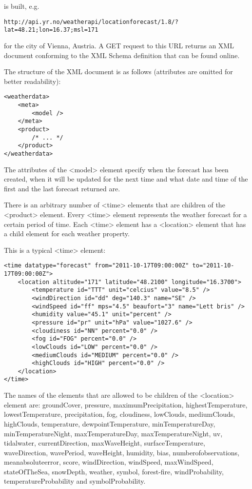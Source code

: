 is built, e.g.

\begin{lstlisting}
http://api.yr.no/weatherapi/locationforecast/1.8/?lat=48.21;lon=16.37;msl=171
\end{lstlisting}

for the city of Vienna, Austria. A GET request to this URL returns an XML document conforming to the XML Schema definition that can be found
online.

The structure of the XML document is as follows (attributes are omitted for better readability):

\begin{lstlisting}
<weatherdata>
	<meta>
		<model />
	</meta>
	<product>
		/* ... */
	</product>
</weatherdata>
\end{lstlisting}

The attributes of the <model> element specify when the forecast has been created, when it will be updated for the next time and what date and time of the first and the last forecast returned are.

There is an arbitrary number of <time> elements that are children of the <product> element. Every <time> element represents the weather forecast for a certain period of time. Each <time> element has a <location> element that has a child element for each weather property.

This is a typical <time> element:

\begin{lstlisting}
<time datatype="forecast" from="2011-10-17T09:00:00Z" to="2011-10-17T09:00:00Z">
	<location altitude="171" latitude="48.2100" longitude="16.3700">
		<temperature id="TTT" unit="celcius" value="8.5" />
		<windDirection id="dd" deg="140.3" name="SE" />
		<windSpeed id="ff" mps="4.5" beaufort="3" name="Lett bris" />
		<humidity value="45.1" unit="percent" />
		<pressure id="pr" unit="hPa" value="1027.6" />
		<cloudiness id="NN" percent="0.0" />
		<fog id="FOG" percent="0.0" />
		<lowClouds id="LOW" percent="0.0" />
		<mediumClouds id="MEDIUM" percent="0.0" />
		<highClouds id="HIGH" percent="0.0" />
	</location>
</time>
\end{lstlisting}

The names of the elements that are allowed to be children of the <location> element are: groundCover, pressure, maximumPrecipitation, highestTemperature, lowestTemperature, precipitation, fog, cloudiness, lowClouds, mediumClouds, highClouds, temperature, dewpointTemperature, minTemperatureDay, minTemperatureNight, maxTemperatureDay, maxTemperatureNight, uv, tidalwater, currentDirection, maxWaveHeight, surfaceTemperature, waveDirection, wavePeriod, waveHeight, humidity, bias, numberofobservations, meanabsoluteerror, score, windDirection, windSpeed, maxWindSpeed, stateOfTheSea, snowDepth, weather, symbol, forest-fire, windProbability, temperatureProbability and symbolProbability.

